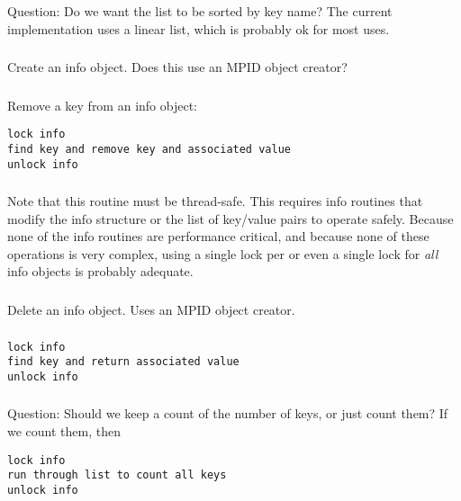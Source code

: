 \documentclass{article}
\begin{document}
Question: Do we want the list to be sorted by key name?  The current
implementation uses a linear list, which is probably ok for most uses.

\subsubsection{}
Create an info object.  Does this use an MPID object creator?

\subsubsection{}
Remove a key from an info object:
\begin{verbatim}
lock info
find key and remove key and associated value
unlock info
\end{verbatim}

\subsubsection{}
Note that this routine must be thread-safe.  This requires info routines that
modify the info structure or the list of key/value pairs to operate safely.
Because none of the info routines are performance critical, and because none
of these operations is very complex, using a single lock per 
or even a single lock for \emph{all} info objects is probably adequate.


\subsubsection{}
Delete an info object.  Uses an MPID object creator.

\subsubsection{}
\begin{verbatim}
lock info
find key and return associated value
unlock info
\end{verbatim}

\subsubsection{}
Question:  Should we keep a count of the number of keys, or just count them?
If we count them, then
\begin{verbatim}
lock info
run through list to count all keys
unlock info
\end{verbatim}
\end{document}
